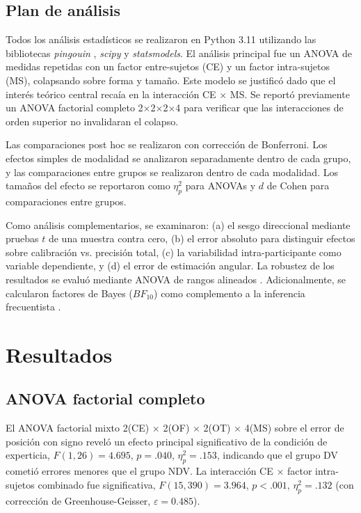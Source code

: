 \documentclass[12pt,letterpaper]{article}
\begin{document}
\subsection{Plan de análisis}

Todos los análisis estadísticos se realizaron en Python 3.11 utilizando las bibliotecas \textit{pingouin} \parencite{Vallat2018}, \textit{scipy} y \textit{statsmodels}. El análisis principal fue un ANOVA de medidas repetidas con un factor entre-sujetos (CE) y un factor intra-sujetos (MS), colapsando sobre forma y tamaño. Este modelo se justificó dado que el interés teórico central recaía en la interacción CE $\times$ MS. Se reportó previamente un ANOVA factorial completo 2$\times$2$\times$2$\times$4 para verificar que las interacciones de orden superior no invalidaran el colapso.

Las comparaciones post hoc se realizaron con corrección de Bonferroni. Los efectos simples de modalidad se analizaron separadamente dentro de cada grupo, y las comparaciones entre grupos se realizaron dentro de cada modalidad. Los tamaños del efecto se reportaron como $\eta^2_p$ para ANOVAs y $d$ de Cohen para comparaciones entre grupos.

Como análisis complementarios, se examinaron: (a) el sesgo direccional mediante pruebas $t$ de una muestra contra cero, (b) el error absoluto para distinguir efectos sobre calibración vs. precisión total, (c) la variabilidad intra-participante como variable dependiente, y (d) el error de estimación angular. La robustez de los resultados se evaluó mediante ANOVA de rangos alineados \parencite[ART;][]{Wobbrock2011,Elkin2021}. Adicionalmente, se calcularon factores de Bayes ($BF_{10}$) como complemento a la inferencia frecuentista \parencite{vanDoorn2021}.

\section{Resultados}

\subsection{ANOVA factorial completo}

El ANOVA factorial mixto 2(CE) $\times$ 2(OF) $\times$ 2(OT) $\times$ 4(MS) sobre el error de posición con signo reveló un efecto principal significativo de la condición de experticia, $F(1, 26) = 4.695$, $p = .040$, $\eta^2_p = .153$, indicando que el grupo DV cometió errores menores que el grupo NDV. La interacción CE $\times$ factor intra-sujetos combinado fue significativa, $F(15, 390) = 3.964$, $p < .001$, $\eta^2_p = .132$ (con corrección de Greenhouse-Geisser, $\varepsilon = 0.485$).
\end{document}
